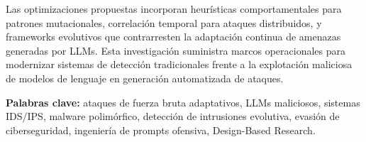 Las optimizaciones propuestas incorporan heurísticas comportamentales para patrones mutacionales, correlación temporal para ataques distribuidos, y frameworks evolutivos que contrarresten la adaptación continua de amenazas generadas por LLMs. Esta investigación suministra marcos operacionales para modernizar sistemas de detección tradicionales frente a la explotación maliciosa de modelos de lenguaje en generación automatizada de ataques.

\textbf{Palabras clave:} ataques de fuerza bruta adaptativos, LLMs maliciosos, sistemas IDS/IPS, malware polimórfico, detección de intrusiones evolutiva, evasión de ciberseguridad, ingeniería de prompts ofensiva, Design-Based Research.

\titlespacing*{\chapter}{0pt}{50pt}{40pt} 
\glsresetall
\clearpage